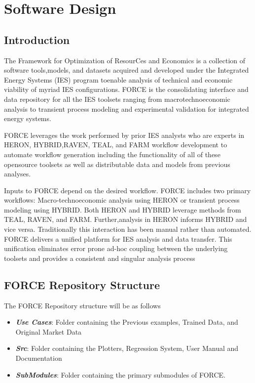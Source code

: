 \section{Software Design}
\subsection{Introduction}
The Framework for Optimization of ResourCes and Economics is a collection of software tools,models, and datasets acquired and developed under the Integrated Energy Systems (IES) program toenable analysis of technical and economic viability of myriad IES configurations. FORCE is the consolidating interface and data repository for all the IES toolsets ranging from macrotechnoeconomic analysis to transient process modeling and experimental validation for integrated energy systems. 

FORCE leverages the work performed by prior IES analysts who are experts in HERON, HYBRID,RAVEN, TEAL, and FARM workflow development to automate workflow generation including the functionality of all of these opensource toolsets as well as distributable data and models from previous analyses.

Inputs to FORCE depend on the desired workflow. FORCE includes two primary workflows: Macro-technoeconomic analysis using HERON or transient process modeling using HYBRID. Both HERON and HYBRID leverage methods from TEAL, RAVEN, and FARM. Further,analysis in HERON informs HYBRID and vice versa. Traditionally this interaction has been manual rather than automated. FORCE delivers a unified platform for IES analysis and data transfer. This unification eliminates error prone ad-hoc coupling between the underlying toolsets and provides a consistent and singular analysis process 

\subsection{FORCE Repository Structure}
The FORCE Repository structure will be as follows

\begin{itemize}
\item \textbf{\textit{Use Cases}}: Folder containing the Previous examples, Trained Data, and Original Market Data
\item \textbf{\textit{Src}}: Folder containing the Plotters, Regression System, User Manual and Documentation
\item \textbf{\textit{SubModules}}: Folder containing the primary submodules of FORCE. 
\end{itemize}


